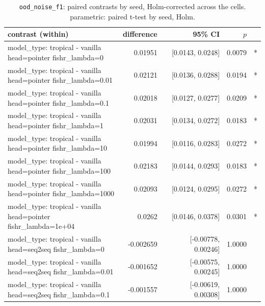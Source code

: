 \documentclass[10pt]{article}
\makeatletter
\newcommand{\stackcell}[1]{\begin{tabular}[t]{@{}l@{}}#1\end{tabular}}
\makeatother
\begin{document}
{\small
\begin{longtable}{lrrrl}
\caption{\texttt{ood\_noise\_f1}: paired contrasts by seed, Holm-corrected across the cells. parametric: paired t-test by seed, Holm.}\label{tab:paired-ood_noise_f1}\\
\toprule
contrast (within) & difference & 95\% CI & $p$ & \\
\midrule
\endhead
\stackcell{model\_type: tropical - vanilla\\\footnotesize head=pointer fishr\_lambda=0 } & 0.01951 & [0.0143, 0.0248] & 0.0079 & *\\
\stackcell{model\_type: tropical - vanilla\\\footnotesize head=pointer fishr\_lambda=0.01 } & 0.02121 & [0.0136, 0.0288] & 0.0194 & *\\
\stackcell{model\_type: tropical - vanilla\\\footnotesize head=pointer fishr\_lambda=0.1 } & 0.02018 & [0.0127, 0.0277] & 0.0209 & *\\
\stackcell{model\_type: tropical - vanilla\\\footnotesize head=pointer fishr\_lambda=1 } & 0.02031 & [0.0134, 0.0272] & 0.0183 & *\\
\stackcell{model\_type: tropical - vanilla\\\footnotesize head=pointer fishr\_lambda=10 } & 0.01994 & [0.0116, 0.0283] & 0.0272 & *\\
\stackcell{model\_type: tropical - vanilla\\\footnotesize head=pointer fishr\_lambda=100 } & 0.02183 & [0.0144, 0.0293] & 0.0183 & *\\
\stackcell{model\_type: tropical - vanilla\\\footnotesize head=pointer fishr\_lambda=1000 } & 0.02093 & [0.0124, 0.0295] & 0.0272 & *\\
\stackcell{model\_type: tropical - vanilla\\\footnotesize head=pointer fishr\_lambda=1e+04 } & 0.0262 & [0.0146, 0.0378] & 0.0301 & *\\
\stackcell{model\_type: tropical - vanilla\\\footnotesize head=seq2seq fishr\_lambda=0 } & -0.002659 & [-0.00778, 0.00246] & 1.0000 & \\
\stackcell{model\_type: tropical - vanilla\\\footnotesize head=seq2seq fishr\_lambda=0.01 } & -0.001652 & [-0.00575, 0.00245] & 1.0000 & \\
\stackcell{model\_type: tropical - vanilla\\\footnotesize head=seq2seq fishr\_lambda=0.1 } & -0.001557 & [-0.00619, 0.00308] & 1.0000 & \\

\end{longtable}}
\end{document}
